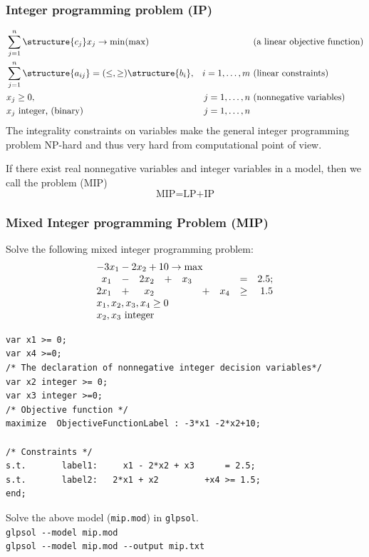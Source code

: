 \documentclass[landscape]{beamer}
\begin{document}
\begin{frame}
  \frametitle{Integer programming problem (IP)}  
\begin{align*}
     & \sum_{j=1}^{n}\structure{c_j} x_j \rightarrow \min (\max)&& \text{ (a linear objective function)}\\
      &\sum_{j=1}^{n} \structure{a_{ij}} = (\leq, \geq) \structure{b_i},  & i=1,\ldots, m&\text{  (linear constraints) }\\
      &x_j\geq 0,  &j=1,\ldots, n& \text{ (nonnegative variables)}\\
      &x_j \text{ integer, (binary)}&j=1,\ldots, n&
\end{align*}
The integrality constraints on variables make the general integer programming problem 
\alert{NP-hard}
and thus very hard from computational point of view.

If there exist real nonnegative variables and integer variables in a model, then
we call the problem  (MIP)
\[
\text{MIP=LP+IP}
\]




\end{frame}

\begin{frame}[fragile]
  \frametitle{Mixed Integer programming Problem (MIP)}
\begin{small}
Solve the following mixed integer programming problem:
\[
\begin{array}{rrrrrrrrr} 
               \multicolumn{9}{l}{-3 x_1 -2 x_2+10\rightarrow \max}\\ 
                                             x_1& -& 2 x_2& + &x_3& &     &=& 2.5;\\             
                                             2x_1& + &x_2 &&&        +&x_4& \geq& 1.5\\                              
              \multicolumn{9}{l}{x_1, x_2, x_3,x_4 \geq 0}\\
               \multicolumn{9}{l}{x_2, x_3 \text{ integer} }
\end{array}
\]
\end{small}
\vspace{-0.8cm}
\begin{tiny}
\begin{verbatim}
var x1 >= 0;
var x4 >=0;
/* The declaration of nonnegative integer decision variables*/
var x2 integer >= 0;
var x3 integer >=0;
/* Objective function */
maximize  ObjectiveFunctionLabel : -3*x1 -2*x2+10;

/* Constraints */
s.t.       label1:     x1 - 2*x2 + x3      = 2.5;
s.t.       label2:   2*x1 + x2         +x4 >= 1.5; 
end;
\end{verbatim}
\end{tiny}
\begin{small}
Solve the above model (\texttt{mip.mod}) in \texttt{glpsol}.\\
\verb=glpsol --model mip.mod=\\
\verb=glpsol --model mip.mod --output mip.txt=
\end{small}

\end{frame}
  
\end{document}
